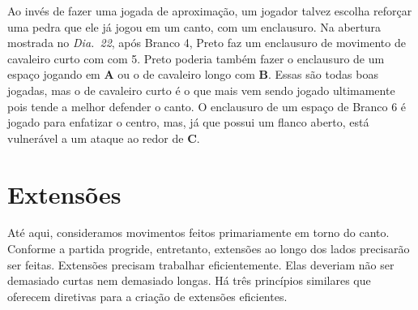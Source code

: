 Ao invés de fazer uma jogada de aproximação, um jogador talvez escolha reforçar uma pedra que ele já jogou em um canto, com um enclausuro. Na abertura mostrada no \emph{Dia.\@~22}, após Branco 4, Preto faz um enclausuro de movimento de cavaleiro curto com com 5. Preto poderia também fazer o enclausuro de um espaço jogando em \textbf{A} ou o de cavaleiro longo com \textbf{B}. Essas são todas boas jogadas, mas o de cavaleiro curto é o que mais vem sendo jogado ultimamente pois tende a melhor defender o canto. O enclausuro de um espaço de Branco 6 é jogado para enfatizar o centro, mas, já que possui um flanco aberto, está vulnerável a um ataque ao redor de \textbf{C}.

\pagebreak

\section{Extensões}

Até aqui, consideramos movimentos feitos primariamente em torno do canto. Conforme a partida progride, entretanto, extensões ao longo dos lados precisarão ser feitas. Extensões precisam trabalhar eficientemente. Elas deveriam não ser demasiado curtas nem demasiado longas. Há três princípios similares que oferecem diretivas para a criação de extensões eficientes.

